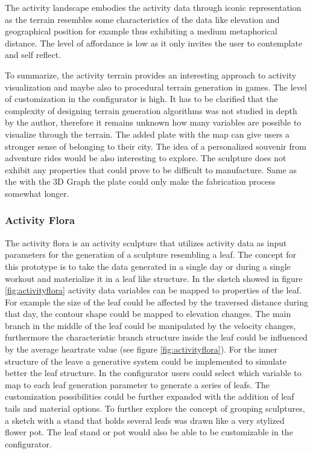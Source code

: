 \documentclass[../medieninformatik-arbeit.tex]{subfiles}
\begin{document}
The activity landscape embodies the activity data through iconic representation as the terrain resembles some characteristics of the data like elevation and geographical position for example thus exhibiting a medium metaphorical distance. The level of affordance is low as it only invites the user to contemplate and self reflect. 

To summarize, the activity terrain provides an interesting approach to activity visualization and maybe also to procedural terrain generation in games. The level of customization in the configurator is high. It has to be clarified that the complexity of designing terrain generation algorithms was not studied in depth by the author, therefore it remains unknown how many variables are possible to visualize through the terrain. The added plate with the map can give users a stronger sense of belonging to their city. The idea of a personalized souvenir from adventure rides would be also interesting to explore. The sculpture does not exhibit any properties that could prove to be difficult to manufacture. Same as the with the 3D Graph the plate could only make the fabrication process somewhat longer.  

\subsubsection{Activity Flora}
The activity flora is an activity sculpture that utilizes activity data as input parameters for the generation of a sculpture resembling a leaf. The concept for this prototype is to take the data generated in a single day or during a single workout and materialize it in a leaf like structure. In the sketch showed in figure \ref{fig:activityflora} activity data variables can be mapped to properties of the leaf. For example the size of the leaf could be affected by the traversed distance during that day, the contour shape could be mapped to elevation changes. The main branch in the middle of the leaf could be manipulated by the velocity changes, furthermore the characteristic branch structure inside the leaf could be influenced by the average heartrate value (see figure \ref{fig:activityflora}). For the inner structure of the leave a generative system could be implemented to simulate better the leaf structure. In the configurator users could select which variable to map to each leaf generation parameter to generate a series of leafs. The customization possibilities could be further expanded with the addition of leaf tails and material options. To further explore the concept of grouping sculptures, a sketch with a stand that holds several leafs was drawn like a very stylized flower pot. The leaf stand or pot would also be able to be customizable in the configurator.  
\end{document}
